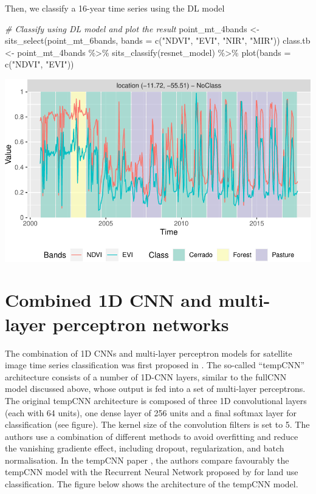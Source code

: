 \documentclass[a4paper,]{tufte-book}
\newenvironment{Shaded}{}{}
\newcommand{\AttributeTok}[1]{\textcolor[rgb]{0.49,0.56,0.16}{#1}}
\newcommand{\CommentTok}[1]{\textcolor[rgb]{0.38,0.63,0.69}{\textit{#1}}}
\newcommand{\FunctionTok}[1]{\textcolor[rgb]{0.02,0.16,0.49}{#1}}
\newcommand{\NormalTok}[1]{#1}
\newcommand{\OtherTok}[1]{\textcolor[rgb]{0.00,0.44,0.13}{#1}}
\newcommand{\SpecialCharTok}[1]{\textcolor[rgb]{0.25,0.44,0.63}{#1}}
\newcommand{\StringTok}[1]{\textcolor[rgb]{0.25,0.44,0.63}{#1}}
\begin{document}
Then, we classify a 16-year time series using the DL model

\begin{Shaded}
\begin{Highlighting}[]
\CommentTok{\# Classify using DL model and plot the result}
\NormalTok{point\_mt\_4bands }\OtherTok{\textless{}{-}} \FunctionTok{sits\_select}\NormalTok{(point\_mt\_6bands, }
                               \AttributeTok{bands =} \FunctionTok{c}\NormalTok{(}\StringTok{"NDVI"}\NormalTok{, }\StringTok{"EVI"}\NormalTok{, }\StringTok{"NIR"}\NormalTok{, }\StringTok{"MIR"}\NormalTok{))}
\NormalTok{class.tb }\OtherTok{\textless{}{-}}\NormalTok{ point\_mt\_4bands }\SpecialCharTok{\%\textgreater{}\%} 
    \FunctionTok{sits\_classify}\NormalTok{(resnet\_model) }\SpecialCharTok{\%\textgreater{}\%} 
    \FunctionTok{plot}\NormalTok{(}\AttributeTok{bands =} \FunctionTok{c}\NormalTok{(}\StringTok{"NDVI"}\NormalTok{, }\StringTok{"EVI"}\NormalTok{))}
\end{Highlighting}
\end{Shaded}

\begin{center}\includegraphics[width=0.7\linewidth]{sitsbook_files/figure-latex/unnamed-chunk-57-1} \end{center}

\hypertarget{combined-1d-cnn-and-multi-layer-perceptron-networks}{%
\section{Combined 1D CNN and multi-layer perceptron networks}\label{combined-1d-cnn-and-multi-layer-perceptron-networks}}

The combination of 1D CNNs and multi-layer perceptron models for satellite image time series classification was first proposed in \citet{Pelletier2019}. The so-called ``tempCNN'' architecture consists of a number of 1D-CNN layers, similar to the fullCNN model discussed above, whose output is fed into a set of multi-layer perceptrons. The original tempCNN architecture is composed of three 1D convolutional layers (each with 64 units), one dense layer of 256 units and a final softmax layer for classification (see figure). The kernel size of the convolution filters is set to 5. The authors use a combination of different methods to avoid overfitting and reduce the vanishing gradiente effect, including dropout, regularization, and batch normalisation. In the tempCNN paper \citep{Pelletier2019}, the authors compare favourably the tempCNN model with the Recurrent Neural Network proposed by \citet{Russwurm2018} for land use classification. The figure below shows the architecture of the tempCNN model.
\end{document}
